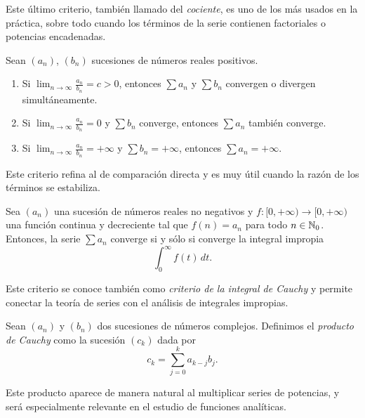 Este último criterio, también llamado del \textit{cociente}, es uno de los más usados en la práctica, sobre todo cuando los términos de la serie contienen factoriales o potencias encadenadas.

\begin{proposition}
    Sean $(a_n)$, $(b_n)$ sucesiones de números reales positivos.
    \begin{enumerate}
        \item Si $\lim_{n \to \infty} \tfrac{a_n}{b_n} = c > 0$, entonces $\sum a_n$ y $\sum b_n$ 
        convergen o divergen simultáneamente.
        \item Si $\lim_{n \to \infty} \tfrac{a_n}{b_n} = 0$ y $\sum b_n$ converge, entonces 
        $\sum a_n$ también converge.
        \item Si $\lim_{n \to \infty} \tfrac{a_n}{b_n} = +\infty$ y $\sum b_n = +\infty$, 
        entonces $\sum a_n = +\infty$.
    \end{enumerate}
\end{proposition}

Este criterio refina al de comparación directa y es muy útil cuando la razón de los términos se estabiliza.

\begin{proposition}
    Sea $(a_n)$ una sucesión de números reales no negativos y 
    $f : [0,+\infty) \to [0,+\infty)$ una función continua y decreciente tal que $f(n) = a_n$
    para todo $n \in \mathbb{N}_0$. Entonces, la serie $\sum a_n$ converge si y sólo si 
    converge la integral impropia
    \begin{equation*}
        \int_0^{\infty} f(t)\,dt.
    \end{equation*}
\end{proposition}

Este criterio se conoce también como \textit{criterio de la integral de Cauchy} y permite conectar 
la teoría de series con el análisis de integrales impropias.

\begin{definition}
    Sean $(a_n)$ y $(b_n)$ dos sucesiones de números complejos. Definimos el 
    \emph{producto de Cauchy} como la sucesión $(c_k)$ dada por
    \begin{equation*}
        c_k = \sum_{j=0}^k a_{k-j} b_j.
    \end{equation*}
\end{definition}

Este producto aparece de manera natural al multiplicar series de potencias, 
y será especialmente relevante en el estudio de funciones analíticas.

